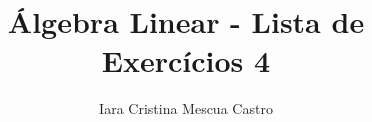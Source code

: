 \documentclass[leqno]{article}
\numberwithin{equation}{section}
\begin{document}
	
	\newtheorem*{prop*}{Proposição}
	\newtheorem{lema}[teo]{Lemma} \newtheorem*{lema*}{Lema}
	\newtheorem*{cor*}{Corolário}
	
	\theoremstyle{definition}
	\newtheorem{defi}[teo]{Definição} \newtheorem*{defi*}{Definição}
	\newtheorem{exem}[teo]{Exemplo} \newtheorem*{exem*}{Exemplo}
	\newtheorem{obs}[teo]{Observação} \newtheorem*{obs*}{Observação}
	\newtheorem*{hipo}{Hipóteses}
	\newtheorem*{nota}{Notação}
	
	\newcommand{\ds}{\displaystyle} \newcommand{\nl}{\newline}
	\newcommand{\eps}{\varepsilon} \newcommand{\ssty}{\scriptstyle}
	\newcommand{\bE}{\mathbb{E}}
	\newcommand{\cB}{\mathcal{B}}
	\newcommand{\cF}{\mathcal{F}}
	\newcommand{\cA}{\mathcal{A}}
	\newcommand{\cM}{\mathcal{M}}
	\newcommand{\cD}{\mathcal{D}}
	\newcommand{\cN}{\mathcal{N}}
	\newcommand{\cL}{\mathcal{L}}
	\newcommand{\cLN}{\mathcal{LN}}
	\newcommand{\bP}{\mathbb{P}}
	\newcommand{\bQ}{\mathbb{Q}}
	\newcommand{\bN}{\mathbb{N}}
	\newcommand{\R}{\mathbb{R}}
	\newcommand{\bZ}{\mathbb{Z}}
	
	\DeclarePairedDelimiter{\dotprod}{\langle}{\rangle} 
	\newcommand{\defeq}{\vcentcolon=}
	\newcommand{\bfw}{\mathbf{w}}
	\newcommand{\bfv}{\mathbf{v}}
	\newcommand{\bfu}{\mathbf{u}}
	
	\newcommand{\bvecc}[2]{%
		\begin{bmatrix} #1 \\ #2  \end{bmatrix}
	}
	\newcommand{\bveccc}[3]{%
		\begin{bmatrix} #1 \\ #2 \\ #3  \end{bmatrix}
	}
	
	\newenvironment{sol}
	{
		\vspace{4mm}
		\noindent\textbf{Resolução:}
		\strut\newline
		\smallskip
		\hspace{-3.5mm}
	}
	{} 
	
	\title{Álgebra Linear - Lista de Exercícios 4}
	
	\author{Iara Cristina Mescua Castro}
	
	\date{}
	
	\maketitle
	
\end{document}
